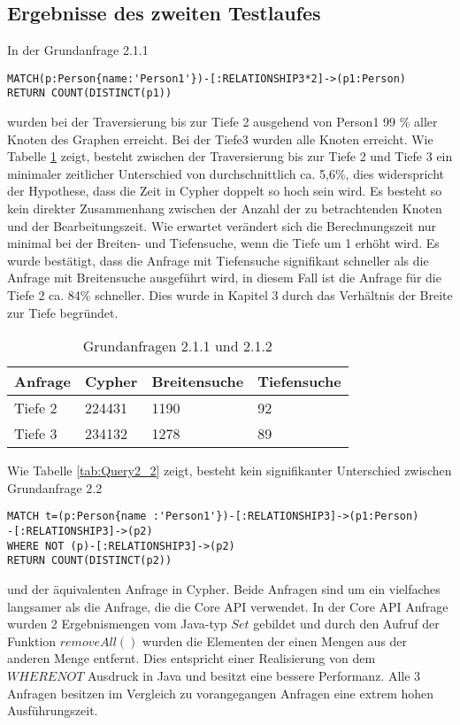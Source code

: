 \subsection{Ergebnisse des zweiten Testlaufes}
In der Grundanfrage 2.1.1
\begin{Verbatim}[frame=single]
MATCH(p:Person{name:'Person1'})-[:RELATIONSHIP3*2]->(p1:Person) 
RETURN COUNT(DISTINCT(p1))
\end{Verbatim}
 wurden bei der Traversierung bis zur Tiefe 2 ausgehend von Person1 99 \% aller Knoten des Graphen erreicht. Bei der Tiefe3 wurden alle Knoten erreicht. Wie Tabelle \ref{tab:Query2_1} zeigt, besteht zwischen der Traversierung bis zur Tiefe 2 und Tiefe 3  ein minimaler zeitlicher Unterschied von durchschnittlich ca. 5,6\%, dies widerspricht der Hypothese, dass die Zeit in Cypher doppelt so hoch sein wird. Es besteht so kein direkter Zusammenhang zwischen der Anzahl der zu betrachtenden Knoten und der Bearbeitungszeit. Wie erwartet verändert sich die Berechnungszeit nur minimal bei der Breiten- und Tiefensuche, wenn die Tiefe um 1 erhöht wird.  \newline 
Es wurde bestätigt, dass die Anfrage mit Tiefensuche signifikant schneller als die Anfrage mit Breitensuche ausgeführt wird, in diesem Fall ist die Anfrage für die Tiefe 2 ca. 84\% schneller. Dies wurde in Kapitel 3 durch das Verhältnis der Breite zur Tiefe begründet. 
\FloatBarrier
\begin{table}[h]
\centering
		\begin{tabular}{ |p{3cm}||p{3cm}|p{3cm}|p{3cm}|  }
			\hline
			Anfrage& Cypher & Breitensuche&Tiefensuche\\
			\hline
			Tiefe 2   & 224431    & 1190&  92\\
			Tiefe 3&    234132  & 1278   & 89\\
			\hline
		\end{tabular}
		\caption{Grundanfragen 2.1.1 und 2.1.2}
		\label{tab:Query2_1}
\end{table}
\FloatBarrier
\noindent Wie Tabelle \ref{tab:Query2_2} zeigt, besteht kein  signifikanter Unterschied zwischen Grundanfrage 2.2
\begin{Verbatim}[frame=single]
MATCH t=(p:Person{name :'Person1'})-[:RELATIONSHIP3]->(p1:Person)
-[:RELATIONSHIP3]->(p2)
WHERE NOT (p)-[:RELATIONSHIP3]->(p2) 
RETURN COUNT(DISTINCT(p2))
\end{Verbatim} 
 und der äquivalenten Anfrage in Cypher. Beide Anfragen sind um ein vielfaches langsamer als die Anfrage, die die Core API verwendet. In der Core API Anfrage wurden 2 Ergebnismengen vom Java-typ $Set$ gebildet und durch den Aufruf der Funktion $removeAll()$  wurden die Elementen der einen Mengen aus der anderen Menge entfernt. Dies entspricht einer Realisierung von dem $WHERE NOT$ Ausdruck  in Java und besitzt eine bessere Performanz. Alle 3 Anfragen besitzen im Vergleich zu vorangegangen Anfragen eine extrem hohen Ausführungszeit.
